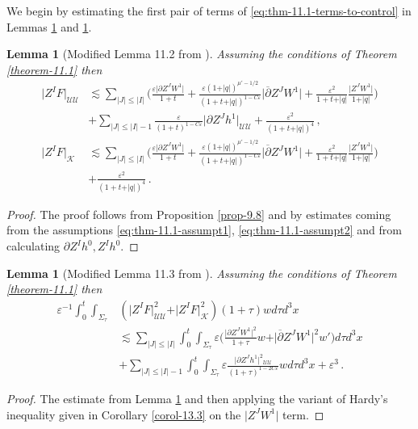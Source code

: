 \documentclass[11pt, a4paper]{amsart}
\numberwithin{equation}{section}
\newtheorem{lemma}[theorem]{Lemma}
\numberwithin{theorem}{section}
\newcommand{\p}{\partial}
\newcommand{\pgood}{\overline{\partial}}
\newcommand{\UU}{{\mathcal{U} \mathcal{U}}}
\newcommand{\K}{\mathcal{K}}
\newcommand{\qv}{\vert q \vert}
\newcommand{\I}{\vert I \vert}
\newcommand{\J}{\vert J \vert}
\begin{document}
We begin by estimating the first pair of terms of \eqref{eq:thm-11.1-terms-to-control} in Lemmas \ref{lemma-11.2} and \ref{lemma-11.3}. 
\begin{lemma}[Modified Lemma 11.2 from \cite{LR:04}] \label{lemma-11.2}
Assuming the conditions of Theorem \ref{theorem-11.1} then
\begin{align*}
\vert Z^I F \vert_\UU & \lesssim \sum_{\vert J \vert \leq \vert I \vert} \Big( \frac{\varepsilon \vert \p Z^J W^1 \vert}{1+t} + \frac{\varepsilon (1+\qv)^{\mu'-1/2}}{(1+t+\qv)^{1-C\varepsilon}} \vert \pgood Z^J W^1 \vert + \frac{\varepsilon^2}{1+t+\qv} \frac{\vert Z^J W^1 \vert}{1+\qv} \Big)  \\
&+ \sum_{\vert J \vert \leq \vert I \vert -1} \frac{\varepsilon}{(1+t)^{1-C\varepsilon}} \vert \p Z^J h^1 \vert_\UU + \frac{\varepsilon^2}{(1+t+\qv)^4} \,, \\
\vert Z^I F \vert_\K & \lesssim \sum_{\vert J \vert \leq \vert I \vert} \Big( \frac{\varepsilon \vert \p Z^J W^1 \vert}{1+t} + \frac{\varepsilon (1+\qv)^{\mu'-1/2}}{(1+t+\qv)^{1-C\varepsilon}} \vert \pgood Z^J W^1 \vert + \frac{\varepsilon^2}{1+t+\qv} \frac{\vert Z^J W^1 \vert}{1+\qv} \Big)  \\
&+  \frac{\varepsilon^2}{(1+t+\qv)^4} \,.
\end{align*}
\end{lemma}
\begin{proof}
The proof follows from Proposition \ref{prop-9.8} and by estimates coming from the assumptions \eqref{eq:thm-11.1-assumpt1}, \eqref{eq:thm-11.1-assumpt2} and from calculating $\p Z^I h^0, Z^I h^0$. 
\end{proof}

\begin{lemma}[Modified Lemma 11.3 from \cite{LR:04}] \label{lemma-11.3}
Assuming the conditions of Theorem \ref{theorem-11.1} then
\begin{align*}
\varepsilon^{-1} \int_0^t \int_{\Sigma_\tau} & \left( \vert Z^I F \vert^2_\UU + \vert Z^I F \vert^2_\K \right) (1+\tau) w d \tau d^3 x \\
& \lesssim \sum_{\J \leq \I} \int_0^t \int_{\Sigma_\tau} \varepsilon \Big( \frac{\vert \p Z^J W^1 \vert^2 }{1+\tau}w + \vert \pgood Z^J W^1 \vert^2 w' \Big) d \tau d^3 x\\
& + \sum_{\J \leq \I  -1 } \int_0^t \int_{\Sigma_\tau} \varepsilon \frac{\vert \p Z^J h^1 \vert^2{}_\UU}{(1+\tau)^{1-2C \varepsilon}} w d \tau d^3 x + \varepsilon^3 \,.
\end{align*}
\end{lemma}
\begin{proof}
The estimate from Lemma \ref{lemma-11.2} and then applying the variant of Hardy's inequality given in Corollary \ref{corol-13.3} on the $\vert Z^J W^1 \vert$ term. 
\end{proof}
\end{document}
